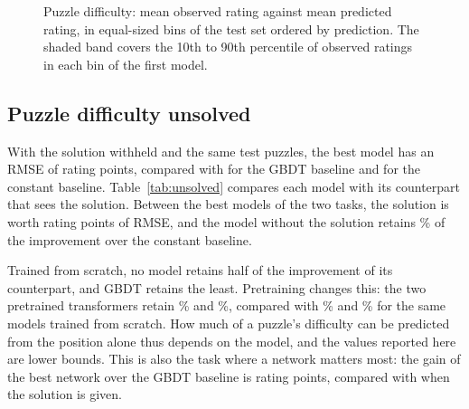 \documentclass[11pt]{article}
\begin{document}
\begin{figure}[htbp]\centering
{}
\caption{Puzzle difficulty: mean observed rating against mean predicted
rating, in equal-sized bins of the test set ordered by prediction. The
shaded band covers the 10th to 90th percentile of observed ratings in each
bin of the first model.}
\label{fig:puzzle}
\end{figure}

\subsection{Puzzle difficulty unsolved}

With the solution withheld and the same
 test puzzles, the best model
has an RMSE of  rating points,
compared with  for the GBDT
baseline and  for the constant
baseline. Table~\ref{tab:unsolved} compares each model with its counterpart
that sees the solution. Between the best models of the two tasks, the
solution is worth  rating
points of RMSE, and the model without the solution retains
\% of the improvement
over the constant baseline.

\begin{table}[htbp]\centering\small
{}
\caption{Puzzle difficulty with the solution withheld (\emph{Hidden}) and
given (\emph{Shown}): each model of the unsolved task beside the model with
the same configuration in puzzle difficulty, on the same test puzzles.
\emph{Difference} is the RMSE advantage of the model that sees the solution.
\emph{Retained} is the percentage of that model's improvement over the
constant baseline that the model without the solution achieves.}
\label{tab:unsolved}
\end{table}

Trained from scratch, no model retains half of the improvement of its
counterpart, and GBDT retains the least. Pretraining changes this: the two
pretrained transformers retain
\%
and
\%,
compared with
\%
and
\% for
the same models trained from scratch. How much of a puzzle's difficulty can
be predicted from the position alone thus depends on the model, and the
values reported here are lower bounds. This is also the task where a network
matters most: the gain of the best network over the GBDT baseline is
 rating points, compared with
 when the solution is given.
\end{document}

